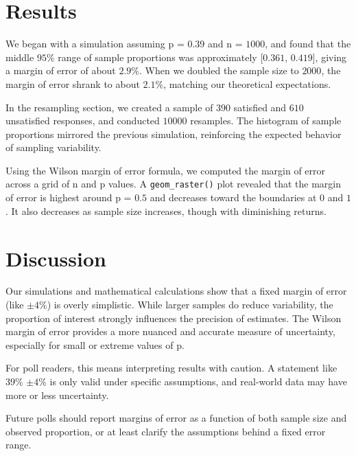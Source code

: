 \documentclass{article}\usepackage[]{graphicx}\usepackage[]{xcolor}
\begin{document}
\begin{multicols}{2}
\section{Results}

We began with a simulation assuming p = $0.39$ and n = $1000$, and found that the middle $95\%$ range of sample proportions was approximately [$0.361$, $0.419$], giving a margin of error of about $2.9\%$. When we doubled the sample size to $2000$, the margin of error shrank to about $2.1\%$, matching our theoretical expectations.

In the resampling section, we created a sample of $390$ satisfied and $610$ unsatisfied responses, and conducted $10000$ resamples. The histogram of sample proportions mirrored the previous simulation, reinforcing the expected behavior of sampling variability.

Using the Wilson margin of error formula, we computed the margin of error across a grid of n and p values. A \texttt{geom\_raster()} plot revealed that the margin of error is highest around p = $0.5$ and decreases toward the boundaries at $0$ and $1$. It also decreases as sample size increases, though with diminishing returns.

\section{Discussion}

Our simulations and mathematical calculations show that a fixed margin of error (like $\pm 4\%$) is overly simplistic. While larger samples do reduce variability, the proportion of interest strongly influences the precision of estimates. The Wilson margin of error provides a more nuanced and accurate measure of uncertainty, especially for small or extreme values of p.

For poll readers, this means interpreting results with caution. A statement like $39\%$ $\pm 4\%$ is only valid under specific assumptions, and real-world data may have more or less uncertainty.

Future polls should report margins of error as a function of both sample size and observed proportion, or at least clarify the assumptions behind a fixed error range.


\vspace{2em}

\begin{tiny}

\end{tiny}
\end{multicols}
\end{document}
